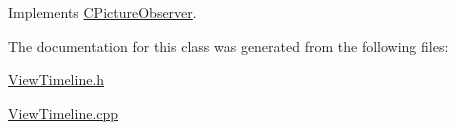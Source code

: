 Implements \hyperlink{class_c_picture_observer_a0dce27216a8cb8a2490f0efc83a5994a}{C\+Picture\+Observer}.



The documentation for this class was generated from the following files\+:\begin{DoxyCompactItemize}
\item 
\hyperlink{_view_timeline_8h}{View\+Timeline.\+h}\item 
\hyperlink{_view_timeline_8cpp}{View\+Timeline.\+cpp}\end{DoxyCompactItemize}
